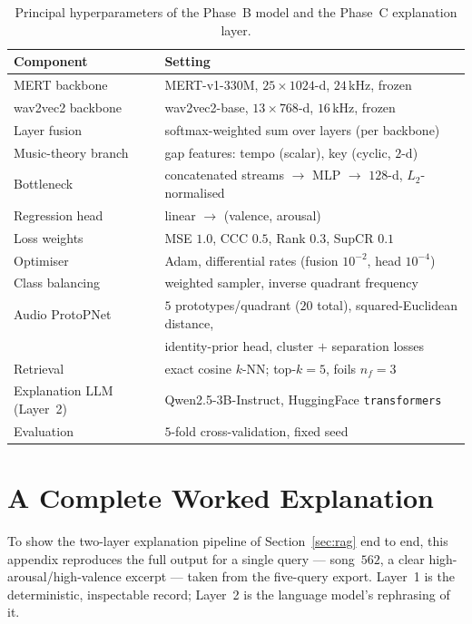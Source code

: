 \documentclass[12pt]{report}
\begin{document}
\begin{table}[ht]
\centering
\small
\begin{tabular}{l l}
\toprule
\textbf{Component} & \textbf{Setting} \\
\midrule
MERT backbone            & MERT-v1-330M, $25\times1024$-d, $24$\,kHz, frozen \\
wav2vec2 backbone        & wav2vec2-base, $13\times768$-d, $16$\,kHz, frozen \\
Layer fusion             & softmax-weighted sum over layers (per backbone) \\
Music-theory branch      & gap features: tempo (scalar), key (cyclic, $2$-d) \\
Bottleneck               & concatenated streams $\rightarrow$ MLP $\rightarrow$ $128$-d, $L_{2}$-normalised \\
Regression head          & linear $\rightarrow$ (valence, arousal) \\
Loss weights             & MSE $1.0$, CCC $0.5$, Rank $0.3$, SupCR $0.1$ \\
Optimiser                & Adam, differential rates (fusion $10^{-2}$, head $10^{-4}$) \\
Class balancing          & weighted sampler, inverse quadrant frequency \\
Audio ProtoPNet          & $5$ prototypes/quadrant ($20$ total), squared-Euclidean distance, \\
                         & identity-prior head, cluster $+$ separation losses \\
Retrieval                & exact cosine $k$-NN; top-$k=5$, foils $n_{f}=3$ \\
Explanation LLM (Layer~2)& Qwen2.5-3B-Instruct, HuggingFace \texttt{transformers} \\
Evaluation               & $5$-fold cross-validation, fixed seed \\
\bottomrule
\end{tabular}
\caption{Principal hyperparameters of the Phase~B model and the Phase~C explanation layer.}
\label{tab:hyperparams}
\end{table}

\chapter{A Complete Worked Explanation}
\label{app:worked-example}

To show the two-layer explanation pipeline of Section~\ref{sec:rag} end to end, this appendix reproduces the full output for a single query --- song~$562$, a clear high-arousal/high-valence excerpt --- taken from the five-query export. Layer~1 is the deterministic, inspectable record; Layer~2 is the language model's rephrasing of it.
\end{document}

